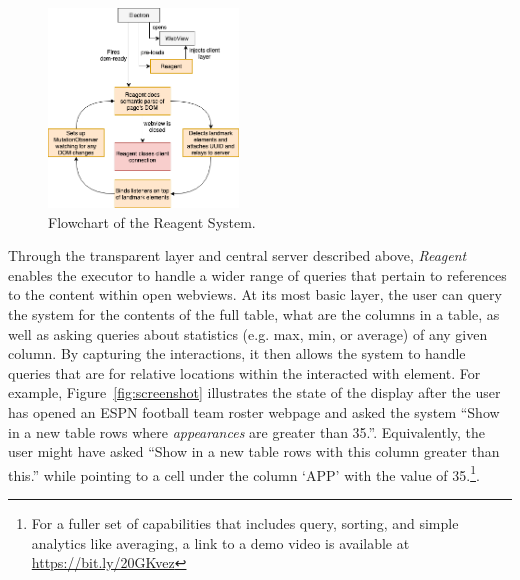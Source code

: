\begin{figure}
\centering
\includegraphics[width=0.45\textwidth]{chapters/03_reagent/figures/reagent.png}
\caption{Flowchart of the Reagent System.}
\label{fig:reagent}
\end{figure}

Through the transparent layer and central server described above, \textit{Reagent} enables
the executor to handle a wider range of queries that pertain to references
to the content within open webviews. At its most basic layer, the user can
query the system for the contents of the full table, what are the columns in a
table, as well as asking queries about statistics (e.g. max, min, or average)
of any given column. By capturing the interactions, it then allows the system
to handle queries that are for relative locations within the interacted with
element. For example, Figure~\ref{fig:screenshot} illustrates the state of the
display after the user has opened an ESPN football team roster webpage and
asked the system ``Show in a new table rows where \textit{appearances} are
greater than 35.''. Equivalently, the user might have asked ``Show in a new
table rows with this column greater than this.'' while pointing to a cell
under the column `APP' with the value of 35.\footnote{For a fuller set of
capabilities that includes query, sorting, and simple analytics like averaging,
a link to a demo video is available at \url{https://bit.ly/20GKvez}}.
